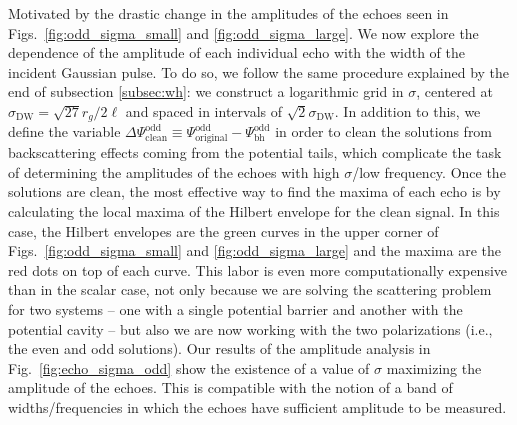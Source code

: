 \documentclass[article,aps,nofootinbib,twocolumn,superscriptaddress]{revtex4-1}
\begin{document}
Motivated by the drastic change in the amplitudes of the echoes seen in Figs.~\ref{fig:odd_sigma_small} and \ref{fig:odd_sigma_large}. We now explore the dependence of the amplitude of each individual echo with the width of the incident Gaussian pulse. To do so, we follow the same procedure explained by the end of subsection \ref{subsec:wh}: we construct a logarithmic grid in $\sigma$, centered at $\sigma_{\mathrm{DW}}=\sqrt{27}r_g/2\ell$ and spaced in intervals of $\sqrt{2}\sigma_{\mathrm{DW}}$. In addition to this, we define the variable $\Delta\Psi^{\mathrm{odd}}_{\mathrm{clean}}\equiv\Psi^{\mathrm{odd}}_{\mathrm{original}}-\Psi^{\mathrm{odd}}_{\mathrm{bh}}$ in order to clean the solutions from backscattering effects coming from the potential tails, which complicate the task of determining the amplitudes of the echoes with high $\sigma$/low frequency. Once the solutions are clean, the most effective way to find the maxima of each echo is by calculating the local maxima of the Hilbert envelope for the clean signal. In this case, the Hilbert envelopes are the green curves in the upper corner of Figs.~\ref{fig:odd_sigma_small} and \ref{fig:odd_sigma_large} and the maxima are the red dots on top of each curve. 
This labor is even more computationally expensive than in the scalar case, not only because we are solving the scattering problem for two systems -- one with a single potential barrier and another with the potential cavity -- but also we are now working with the two polarizations (i.e., the even and odd solutions). Our results of the amplitude analysis in Fig.~\ref{fig:echo_sigma_odd} show the existence of a value of $\sigma$ maximizing the amplitude of the echoes. This is compatible with the notion of a band of widths/frequencies in which the echoes have sufficient amplitude to be measured.    
\end{document}
